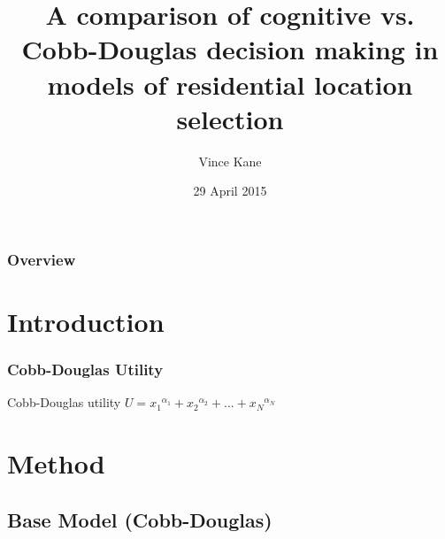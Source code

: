 \documentclass{beamer}
\title[Cognitive Urban Settlement Model]{A comparison of cognitive vs. Cobb-Douglas decision making in models of residential location selection} %
\author{Vince Kane} %
\institute[George Mason University] %
{
Computational Social Science Department,\\
George Mason University \\ %
\medskip
\textit{vkane2@gmu.edu} %
}
\date{29 April 2015} %
\begin{document}
\begin{frame}
\titlepage %
\end{frame}

\begin{frame}
\frametitle{Overview} %
\tableofcontents %
\end{frame}


\section{Introduction} %

\begin{frame}
\frametitle{Cobb-Douglas Utility}

\begin{block}{Cobb-Douglas utility}
\bigskip
$U = {x_1}^{\alpha_1} + {x_2}^{\alpha_2} + ... + {x_N}^{\alpha_N}$
\bigskip
\end{block}

\end{frame}

\section{Method}

\subsection{Base Model (Cobb-Douglas)}
\end{document}
